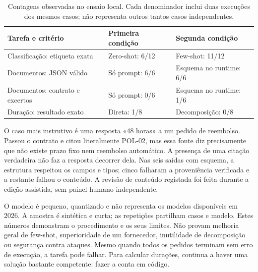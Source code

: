 \begin{table}[htbp]
\small
\begin{tabularx}{\textwidth}{@{}lXX@{}}
\toprule
Tarefa e critério & Primeira condição & Segunda condição \\
\midrule
Classificação: etiqueta exata & Zero-shot: 6/12 & Few-shot: 11/12 \\
Documentos: JSON válido & Só prompt: 6/6 & Esquema no runtime: 6/6 \\
Documentos: contrato e excertos & Só prompt: 0/6 & Esquema no runtime: 1/6 \\
Duração: resultado exato & Direta: 1/8 & Decomposição: 0/8 \\
\bottomrule
\end{tabularx}
\caption{Contagens observadas no ensaio local. Cada denominador inclui duas execuções dos mesmos casos; não representa outros tantos casos independentes.}
\label{tab:ensaio-local}
\end{table}

O caso mais instrutivo é uma resposta «48 horas» a um pedido de reembolso. Passou o contrato e citou literalmente POL-02, mas essa fonte diz precisamente que não existe prazo fixo nem reembolso automático. A presença de uma citação verdadeira não faz a resposta decorrer dela. Nas seis saídas com esquema, a estrutura respeitou os campos e tipos; cinco falharam a proveniência verificada e a restante falhou o conteúdo. A revisão de conteúdo registada foi feita durante a edição assistida, sem painel humano independente.

O modelo é pequeno, quantizado e não representa os modelos disponíveis em 2026. A amostra é sintética e curta; as repetições partilham casos e modelo. Estes números demonstram o procedimento e os seus limites. Não provam melhoria geral de few-shot, superioridade de um fornecedor, inutilidade de decomposição ou segurança contra ataques. Mesmo quando todos os pedidos terminam sem erro de execução, a tarefa pode falhar. Para calcular durações, continua a haver uma solução bastante competente: fazer a conta em código.

